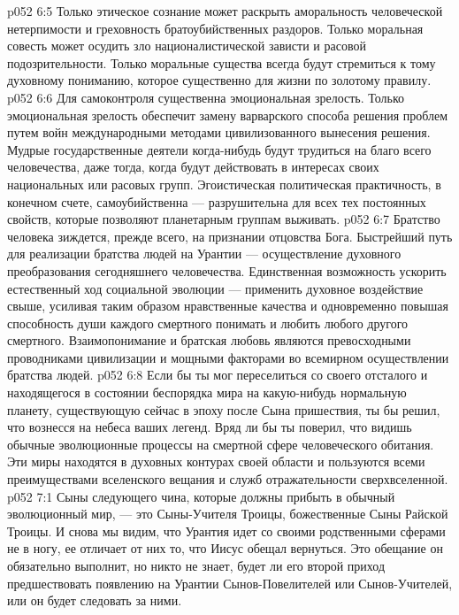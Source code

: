 \vs p052 6:5 \bibnobreakspace {} Только этическое сознание может раскрыть аморальность человеческой нетерпимости и греховность братоубийственных раздоров. Только моральная совесть может осудить зло националистической зависти и расовой подозрительности. Только моральные существа всегда будут стремиться к тому духовному пониманию, которое существенно для жизни по золотому правилу.
\vs p052 6:6 \bibnobreakspace {} Для самоконтроля существенна эмоциональная зрелость. Только эмоциональная зрелость обеспечит замену варварского способа решения проблем путем войн международными методами цивилизованного вынесения решения. Мудрые государственные деятели когда\hyp{}нибудь будут трудиться на благо всего человечества, даже тогда, когда будут действовать в интересах своих национальных или расовых групп. Эгоистическая политическая практичность, в конечном счете, самоубийственна --- разрушительна для всех тех постоянных свойств, которые позволяют планетарным группам выживать.
\vs p052 6:7 \bibnobreakspace {} Братство человека зиждется, прежде всего, на признании отцовства Бога. Быстрейший путь для реализации братства людей на Урантии --- осуществление духовного преобразования сегодняшнего человечества. Единственная возможность ускорить естественный ход социальной эволюции --- применить духовное воздействие свыше, усиливая таким образом нравственные качества и одновременно повышая способность души каждого смертного понимать и любить любого другого смертного. Взаимопонимание и братская любовь являются превосходными проводниками цивилизации и мощными факторами во всемирном осуществлении братства людей.
\vs p052 6:8 \pc Если бы ты мог переселиться со своего отсталого и находящегося в состоянии беспорядка мира на какую\hyp{}нибудь нормальную планету, существующую сейчас в эпоху после Сына пришествия, ты бы решил, что вознесся на небеса ваших легенд. Вряд ли бы ты поверил, что видишь обычные эволюционные процессы на смертной сфере человеческого обитания. Эти миры находятся в духовных контурах своей области и пользуются всеми преимуществами вселенского вещания и служб отражательности сверхвселенной.
\vs p052 7:1 Сыны следующего чина, которые должны прибыть в обычный эволюционный мир, --- это Сыны\hyp{}Учителя Троицы, божественные Сыны Райской Троицы. И снова мы видим, что Урантия идет со своими родственными сферами не в ногу, ее отличает от них то, что Иисус обещал вернуться. Это обещание он обязательно выполнит, но никто не знает, будет ли его второй приход предшествовать появлению на Урантии Сынов\hyp{}Повелителей или Сынов\hyp{}Учителей, или он будет следовать за ними.
